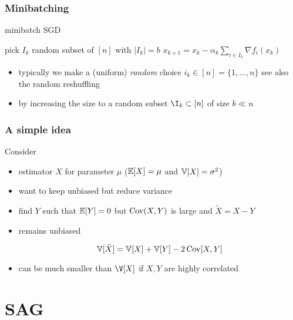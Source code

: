 \documentclass{beamer}
\begin{document}
\begin{frame}
  \frametitle{Minibatching}
  \begin{algorithm}[H]
    \caption{minibatch SGD}
    \begin{algorithmic}[1]
      \State pick $I_k$ random subset of $[n]$ with $\vert I_k \vert = b $
      \State $x_{k+1} = x_k  - \alpha_k \sum_{i \in I_k} \nabla f_{i}(x_k)$
      \Endfor
    \end{algorithmic}
  \end{algorithm}
  \begin{itemize}
    \item typically we make a (uniform) \emph{random} choice $i_k \in [n] = \{1, \dots, n\}$
          see also the random reshuffling
    \item by increasing the size to a random subset $\I_k \subset [n]$ of size $b \ll n$
  \end{itemize}

\end{frame}


\begin{frame}
  \frametitle{A simple idea}
  Consider
  \begin{itemize}
    \item estimator $X$ for parameter $\mu$ ($\mathbb{E}[X]=\mu$ and $\mathbb{V}[X]=\sigma^2$)
    \item want to keep unbiased but reduce variance
    \item find $Y$ such that $\mathbb{E}[Y] = 0$ but $\operatorname*{Cov} (X,Y)$ is large and $\tilde{X}=X-Y$
    \item remains unbiased

          \begin{equation}
            \mathbb{V}[\tilde{X}] = \mathbb{V}[X]+\mathbb{V}[Y]-2\operatorname*{Cov}[X,Y]
          \end{equation}
    \item can be much smaller than $\V[X]$ if $X,Y$ are highly correlated
  \end{itemize}
\end{frame}

\section{SAG}%
\label{sec:}
\end{document}
